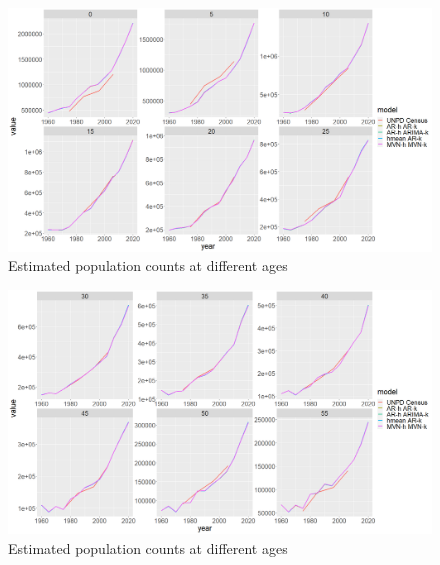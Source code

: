 \documentclass[12pt,a4paper]{article}
\begin{document}
\newpage
\begin{figure}[H]
\includegraphics[width = \linewidth]{Burkina Faso/6/age pop.png} 	
\caption{Estimated population counts at different ages}
\end{figure}
\begin{figure}[H]
\includegraphics[width = \linewidth]{Burkina Faso/6/age pop 2.png}
\caption{Estimated population counts at different ages}
\end{figure}
\end{document}
